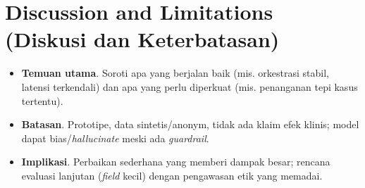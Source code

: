 \section{Discussion and Limitations (Diskusi dan Keterbatasan)}
\label{sec:discussion}

\begin{itemize}
  \item \textbf{Temuan utama}. Soroti apa yang berjalan baik (mis. orkestrasi stabil, latensi terkendali) dan apa yang perlu diperkuat (mis. penanganan tepi kasus tertentu).
  \item \textbf{Batasan}. Prototipe, data sintetis/anonym, tidak ada klaim efek klinis; model dapat bias/\textit{hallucinate} meski ada \textit{guardrail}.
  \item \textbf{Implikasi}. Perbaikan sederhana yang memberi dampak besar; rencana evaluasi lanjutan (\textit{field} kecil) dengan pengawasan etik yang memadai.
\end{itemize}
